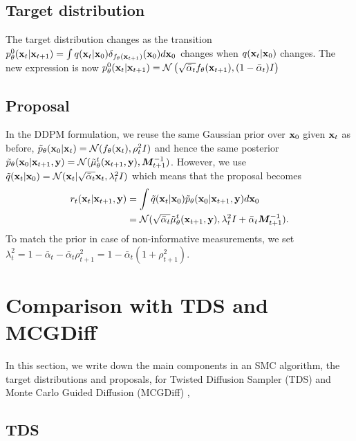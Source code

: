\subsection{Target distribution}
The target distribution changes as the transition $p_\theta^0(\mathbf{x}_{t}|\mathbf{x}_{t+1}) = \int q(\mathbf{x}_{t}|\mathbf{x}_0)\delta_{f_\theta(\mathbf{x}_{t+1})}(\mathbf{x}_0)d\mathbf{x}_0$ changes when $q(\mathbf{x}_{t}|\mathbf{x}_0)$ changes. The new expression is now $p_\theta^0(\mathbf{x}_{t}|\mathbf{x}_{t+1}) = \mathcal{N}\left(\sqrt{\bar \alpha_t}f_\theta(\mathbf{x}_{t+1}), (1-\bar \alpha_t)I\right)$

\subsection{Proposal}
In the DDPM formulation, we reuse the same Gaussian prior over $\mathbf{x}_0$ given $\mathbf{x}_{t}$ as before, $\tilde p_\theta(\mathbf{x}_0|\mathbf{x}_{t}) = \mathcal{N}(f_\theta(\mathbf{x}_{t}), \rho_t^2I)$ and hence the same posterior $\tilde p_\theta(\mathbf{x}_0|\mathbf{x}_{t+1}, \mathbf{y}) = \mathcal{N}(\tilde \mu_\theta^t(\mathbf{x}_{t+1}, \mathbf{y}), {\bm{M}}_{t+1}^{-1})$. However, we use $\tilde q(\mathbf{x}_{t}|\mathbf{x}_0) = \mathcal{N}(\mathbf{x}_{t}|\sqrt{\bar \alpha_t}\mathbf{x}_{t}, \lambda_t^2I)$ which means that the proposal becomes
\begin{align}
    r_t(\mathbf{x}_{t}|\mathbf{x}_{t+1}, \mathbf{y}) 
    &= \int \tilde q(\mathbf{x}_{t}|\mathbf{x}_0) \tilde p_\theta(\mathbf{x}_0|\mathbf{x}_{t+1}, \mathbf{y}) d\mathbf{x}_0 \\
    &= \mathcal{N}(\sqrt{\bar \alpha_t}\tilde \mu^t_\theta(\mathbf{x}_{t+1}, \mathbf{y}), \lambda_t^2I + \bar \alpha_t {\bm{M}}_{t+1}^{-1}).
\end{align}
To match the prior in case of non-informative measurements, we set $\lambda_t^2 = 1- \bar \alpha_t - \bar \alpha_{t} \rho^2_{t+1} = 1 - \bar \alpha_t(1 + \rho_{t+1}^2)$.

\section{Comparison with TDS and MCGDiff}
\label{app:smc_comparison}
In this section, we write down the main components in an SMC algorithm, the target distributions and proposals, for Twisted Diffusion Sampler (TDS) \citep{wu_practical_2023} and Monte Carlo Guided Diffusion (MCGDiff) \citep{cardoso_monte_2023-2},

\subsection{TDS}
